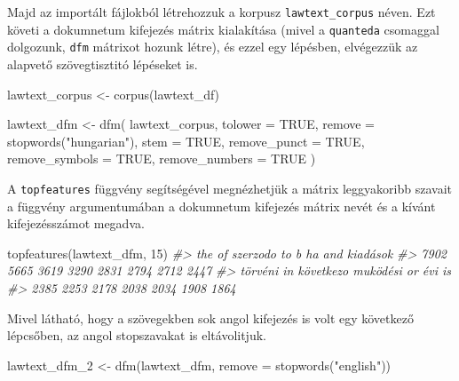 \documentclass[
]{book}
\newenvironment{Shaded}{\begin{snugshade}}{\end{snugshade}}
\newcommand{\AttributeTok}[1]{\textcolor[rgb]{0.77,0.63,0.00}{#1}}
\newcommand{\CommentTok}[1]{\textcolor[rgb]{0.56,0.35,0.01}{\textit{#1}}}
\newcommand{\ConstantTok}[1]{\textcolor[rgb]{0.00,0.00,0.00}{#1}}
\newcommand{\DecValTok}[1]{\textcolor[rgb]{0.00,0.00,0.81}{#1}}
\newcommand{\FunctionTok}[1]{\textcolor[rgb]{0.00,0.00,0.00}{#1}}
\newcommand{\NormalTok}[1]{#1}
\newcommand{\OtherTok}[1]{\textcolor[rgb]{0.56,0.35,0.01}{#1}}
\newcommand{\StringTok}[1]{\textcolor[rgb]{0.31,0.60,0.02}{#1}}
\begin{document}
Majd az importált fájlokból létrehozzuk a korpusz
\texttt{lawtext\_corpus} néven. Ezt követi a dokumnetum kifejezés mátrix
kialakítása (mivel a \texttt{quanteda} csomaggal dolgozunk, \texttt{dfm}
mátrixot hozunk létre), és ezzel egy lépésben, elvégezzük az alapvető
szövegtisztitó lépéseket is.

\begin{Shaded}
\begin{Highlighting}[]

\NormalTok{lawtext\_corpus }\OtherTok{\textless{}{-}} \FunctionTok{corpus}\NormalTok{(lawtext\_df)}

\NormalTok{lawtext\_dfm }\OtherTok{\textless{}{-}} \FunctionTok{dfm}\NormalTok{(}
\NormalTok{  lawtext\_corpus,}
  \AttributeTok{tolower =} \ConstantTok{TRUE}\NormalTok{,}
  \AttributeTok{remove =} \FunctionTok{stopwords}\NormalTok{(}\StringTok{"hungarian"}\NormalTok{),}
  \AttributeTok{stem =} \ConstantTok{TRUE}\NormalTok{,}
  \AttributeTok{remove\_punct =} \ConstantTok{TRUE}\NormalTok{,}
  \AttributeTok{remove\_symbols =} \ConstantTok{TRUE}\NormalTok{,}
  \AttributeTok{remove\_numbers =} \ConstantTok{TRUE}
\NormalTok{)}
\end{Highlighting}
\end{Shaded}

A \texttt{topfeatures} függvény segítségével megnézhetjük a mátrix
leggyakoribb szavait a függvény argumentumában a dokumnetum kifejezés
mátrix nevét és a kívánt kifejezésszámot megadva.

\begin{Shaded}
\begin{Highlighting}[]

\FunctionTok{topfeatures}\NormalTok{(lawtext\_dfm, }\DecValTok{15}\NormalTok{)}
\CommentTok{\#\textgreater{}       the        of  szerzodo        to         b        ha       and  kiadások }
\CommentTok{\#\textgreater{}      7902      5665      3619      3290      2831      2794      2712      2447 }
\CommentTok{\#\textgreater{}   törvéni        in következo  muködési        or       évi        is }
\CommentTok{\#\textgreater{}      2385      2253      2178      2038      2034      1908      1864}
\end{Highlighting}
\end{Shaded}

Mivel látható, hogy a szövegekben sok angol kifejezés is volt egy
következő lépcsőben, az angol stopszavakat is eltávolitjuk.

\begin{Shaded}
\begin{Highlighting}[]

\NormalTok{lawtext\_dfm\_2 }\OtherTok{\textless{}{-}} \FunctionTok{dfm}\NormalTok{(lawtext\_dfm, }\AttributeTok{remove =} \FunctionTok{stopwords}\NormalTok{(}\StringTok{"english"}\NormalTok{))}
\end{Highlighting}
\end{Shaded}
\end{document}
